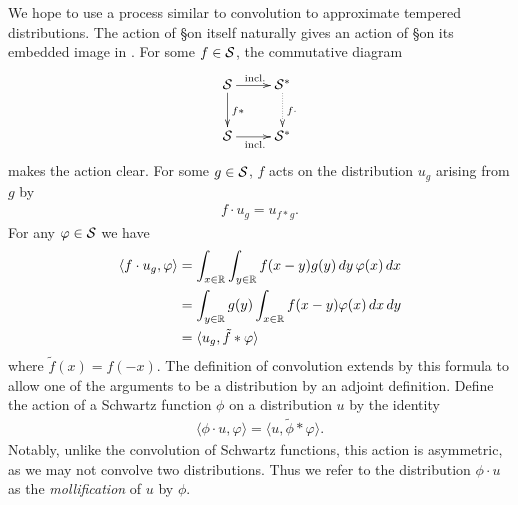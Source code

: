     We hope to use a process similar to convolution to approximate tempered distributions.
    The action of \S on itself naturally gives an action of \S on its embedded image in \SS.
    For some $f\in\S$, the commutative diagram  
    \begin{displaymath}
      \xymatrix{
        \S \ar[r]^{\text{incl.}} \ar[d]^{f*} & \SS \ar@{..>}[d]^{f\cdot}
        \\ \S \ar[r]_{\text{incl.}} & \SS
      }
    \end{displaymath}
    makes the action clear.
    For some $g\in\S$, $f$ acts on the distribution $u_g$ arising from $g$ by
    \begin{align*}
      f\cdot u_g = u_{f*g} \text{.}
    \end{align*}
    For any $\varphi\in\S$ we have
    \begin{align*}
      \langle f\cdot u_g, \varphi\rangle
      &= \int_{x\in\R} \int_{y\in\R} f(x-y)g(y)\,dy\,\varphi(x)\,dx
      \\&= \int_{y\in\R} g(y) \int_{x\in\R} f(x-y)\varphi(x)\,dx\,dy
      \\&= \langle u_g, \tilde f*\varphi\rangle
    \end{align*}
    where $\tilde f(x) = f(-x)$.
    The definition of convolution extends by this formula to allow one of the arguments to be a distribution by an adjoint definition.
    Define the action of a Schwartz function $\phi$ on a distribution $u$ by the identity
    \begin{align*}
      \langle \phi\cdot u, \varphi\rangle
      = \langle u, \tilde\phi*\varphi\rangle \text{.}
    \end{align*}
    Notably, unlike the convolution of Schwartz functions, this action is asymmetric, as we may not convolve two distributions.
    Thus we refer to the distribution $\phi\cdot u$ as the \emph{mollification} of $u$ by $\phi$.

